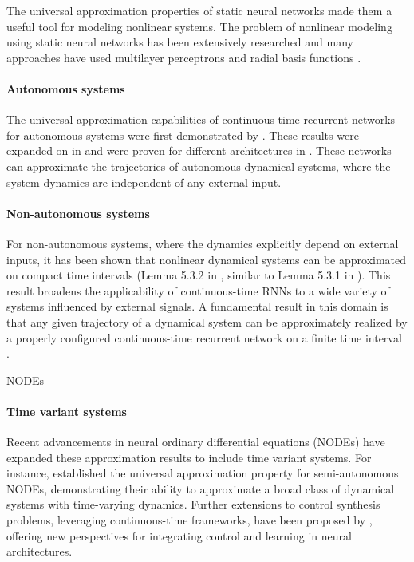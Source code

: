 \documentclass{article}
\theoremstyle{definition}
\theoremstyle{remark}
\newcounter{ct}
\begin{document}
The universal approximation properties of static neural networks \citep{funahashi1989approximate} made them a useful tool for modeling nonlinear systems. 
The problem of nonlinear modeling using static neural networks has been extensively researched \citep{narendra1990identification,warwick1992neural} and many approaches have used multilayer perceptrons and radial basis functions \citep{chen1992neural,choi1996constructive,tan1995efficient}. 

\paragraph{Autonomous systems}
The universal approximation capabilities of continuous-time recurrent networks for autonomous systems were first demonstrated by \citet{funahashi1993approximation}. 
These results were expanded on in \citep{kimura1998learning} and were proven for different architectures in \citep{chow2000modeling}.
These networks can approximate the trajectories of autonomous dynamical systems, where the system dynamics are independent of any external input.


\paragraph{Non-autonomous systems}
For non-autonomous systems, where the dynamics explicitly depend on external inputs, it has been shown that nonlinear dynamical systems can be approximated on compact time intervals (Lemma 5.3.2 in \citep{garces2012strategies}, similar to Lemma 5.3.1 in \citep{smale1974differential}).
This result broadens the applicability of continuous-time RNNs to a wide variety of systems influenced by external signals.
A fundamental result in this domain is that any given trajectory of a dynamical system can be approximately realized by a properly configured continuous-time recurrent network on a finite time interval \citep{nakamura2009approximation}. 
	
	
	
NODEs
\citep{ko2023homotopy}
	
\paragraph{Time variant systems}
Recent advancements in neural ordinary differential equations (NODEs) have expanded these approximation results to include time variant systems. For instance, \citet{li2024universal} established the universal approximation property for semi-autonomous NODEs, demonstrating their ability to approximate a broad class of dynamical systems with time-varying dynamics. Further extensions to control synthesis problems, leveraging continuous-time frameworks, have been proposed by \citet{mei2024controlsynth}, offering new perspectives for integrating control and learning in neural architectures.
\end{document}
